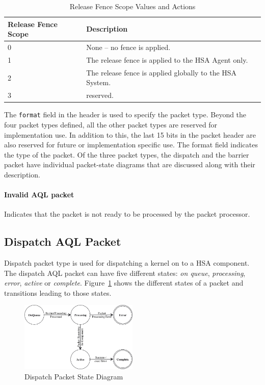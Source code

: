\begin{table}
  \begin{center}
          \begin{tabular}{|p{1in}|p{5in}|}
      \hline
      \textbf{Release Fence Scope} &\textbf{Description} \\ 
      \hline
      0	& None -- no fence is applied. \\
      \hline
      1	& The release fence is applied to the HSA Agent only. \\
      \hline
      2	& The release fence is applied globally to the HSA System.\\
      \hline
      3	& reserved. \\
      \hline
    \end{tabular}
  \end{center}
  \caption{Release Fence Scope Values and Actions}
  \label{releasefencescope}
\end{table}

The \texttt{format} field in the header is used to specify
the packet type. Beyond the four packet types defined, all the
other packet types are reserved for implementation use. In addition
to this, the last 15 bits in the packet header are also reserved for
future or implementation specific use. The format field indicates
the type of the packet. Of the three packet types, the
dispatch and the barrier packet have individual packet-state
diagrams that are discussed along with their description.

\paragraph{Invalid AQL packet} Indicates that the packet is not ready
to be processed by the packet processor. 

\hypertarget{dispatch_packet}{}\subsection{Dispatch AQL
Packet}\label{dispatch_packet}

Dispatch packet type is used for dispatching a kernel on to a HSA
component. The dispatch AQL packet can have five different states:
\emph{on queue}, \emph{processing}, \emph{error}, \emph{active} or
\emph{complete}. Figure~\ref{fig:packetstate} shows the different
states of a packet and transitions leading to those states.

\begin{figure}
  \centering
  \includegraphics[width=0.5\textwidth] {packetstate}
  \centering
  \caption{Dispatch Packet State Diagram}
  \label{fig:packetstate}
\end{figure}

